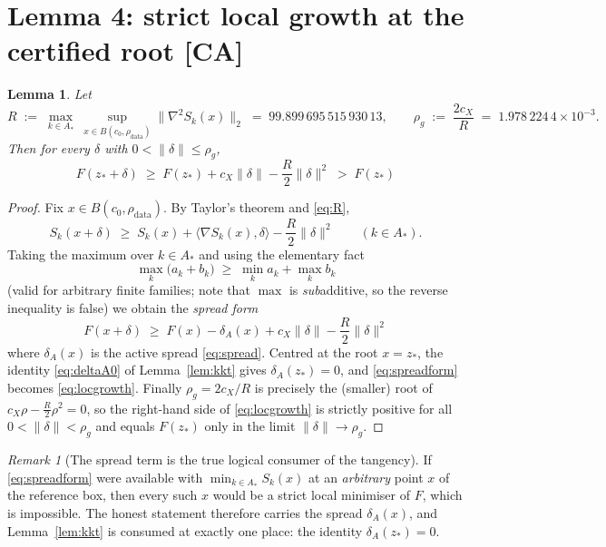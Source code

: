 \documentclass[11pt]{article}
\newtheorem{lemma}[theorem]{Lemma}
\theoremstyle{remark}
\newtheorem{remark}[theorem]{Remark}
\newcommand{\CA}{\textsf{[CA]}}
\begin{document}
\section{Lemma 4: strict local growth at the certified root \CA}\label{lem:growth}

\begin{lemma}\label{lem:growth2}
Let
\begin{equation}\label{eq:R}
R\;:=\;\max_{k\in A_*}\ \sup_{x\in B(c_0,\rho_{\mathrm{data}})}\bigl\|\nabla^2S_k(x)\bigr\|_2
\;=\;99.899\,695\,515\,930\,13,
\qquad
\rho_g\;:=\;\frac{2c_X}{R}\;=\;1.978\,224\,4\times10^{-3}.
\end{equation}
Then for every $\delta$ with $0<\|\delta\|\le\rho_g$,
\begin{equation}\label{eq:locgrowth}
\boxed{\;F(z_*+\delta)\;\ge\;F(z_*)+c_X\|\delta\|-\frac{R}{2}\|\delta\|^{2}\;>\;F(z_*)\;}
\end{equation}
\end{lemma}

\begin{proof}
Fix $x\in B(c_0,\rho_{\mathrm{data}})$. By Taylor's theorem and \eqref{eq:R},
\[
S_k(x+\delta)\;\ge\;S_k(x)+\langle\nabla S_k(x),\delta\rangle-\frac{R}{2}\|\delta\|^2
\qquad(k\in A_*).
\]
Taking the maximum over $k\in A_*$ and using the elementary fact
\begin{equation}\label{eq:subadditive}
\max_{k}\bigl(a_k+b_k\bigr)\;\ge\;\min_{k}a_k+\max_{k}b_k
\end{equation}
(valid for arbitrary finite families; note that $\max$ is \emph{sub}additive, so the reverse inequality is
false) we obtain the \emph{spread form}
\begin{equation}\label{eq:spreadform}
\boxed{\;F(x+\delta)\;\ge\;F(x)-\delta_A(x)+c_X\|\delta\|-\frac{R}{2}\|\delta\|^{2}\;}
\end{equation}
where $\delta_A(x)$ is the active spread \eqref{eq:spread}. Centred at the root $x=z_*$, the identity
\eqref{eq:deltaA0} of Lemma~\ref{lem:kkt} gives $\delta_A(z_*)=0$, and \eqref{eq:spreadform} becomes
\eqref{eq:locgrowth}. Finally $\rho_g=2c_X/R$ is precisely the (smaller) root of
$c_X\rho-\tfrac R2\rho^2=0$, so the right-hand side of \eqref{eq:locgrowth} is strictly positive for all
$0<\|\delta\|<\rho_g$ and equals $F(z_*)$ only in the limit $\|\delta\|\to\rho_g$.
\end{proof}

\begin{remark}[The spread term is the true logical consumer of the tangency]
If \eqref{eq:spreadform} were available with $\min_{k\in A_*}S_k(x)$ at an \emph{arbitrary} point $x$ of
the reference box, then every such $x$ would be a strict local minimiser of $F$, which is impossible. The
honest statement therefore carries the spread $\delta_A(x)$, and Lemma~\ref{lem:kkt} is consumed at exactly
one place: the identity $\delta_A(z_*)=0$.
\end{remark}
\end{document}
